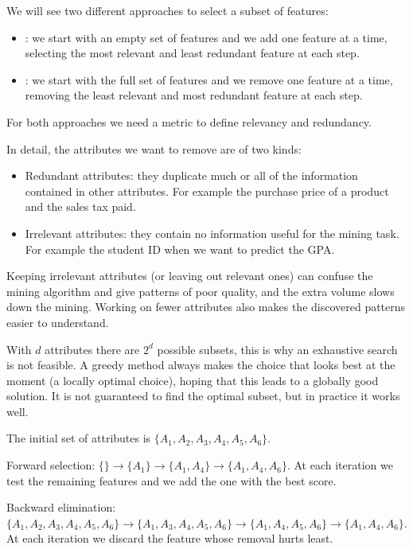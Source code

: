 We will see two different approaches to select a subset of features:
\begin{itemize}
    \item {}: we start with an empty set of features and we add one feature at a time, selecting the most relevant and least redundant feature at each step.
    \item {}: we start with the full set of features and we remove one feature at a time, removing the least relevant and most redundant feature at each step.
\end{itemize}
For both approaches we need a metric to define relevancy and redundancy.

In detail, the attributes we want to remove are of two kinds:
\begin{itemize}
    \item Redundant attributes: they duplicate much or all of the information contained in other attributes. For example the purchase price of a product and the sales tax paid.
    \item Irrelevant attributes: they contain no information useful for the mining task. For example the student ID when we want to predict the GPA.
\end{itemize}
Keeping irrelevant attributes (or leaving out relevant ones) can confuse the mining algorithm and give patterns of poor quality, and the extra volume slows down the mining. Working on fewer attributes also makes the discovered patterns easier to understand.

With $d$ attributes there are $2^d$ possible subsets, this is why an exhaustive search is not feasible. A greedy method always makes the choice that looks best at the moment (a locally optimal choice), hoping that this leads to a globally good solution. It is not guaranteed to find the optimal subset, but in practice it works well.

\begin{example}
The initial set of attributes is $\{A_1,A_2,A_3,A_4,A_5,A_6\}$.

Forward selection: $\{\} \rightarrow \{A_1\} \rightarrow \{A_1,A_4\} \rightarrow \{A_1,A_4,A_6\}$. At each iteration we test the remaining features and we add the one with the best score.

Backward elimination: $\{A_1,A_2,A_3,A_4,A_5,A_6\} \rightarrow \{A_1,A_3,A_4,A_5,A_6\} \rightarrow \{A_1,A_4,A_5,A_6\} \rightarrow \{A_1,A_4,A_6\}$. At each iteration we discard the feature whose removal hurts least.
\end{example}

